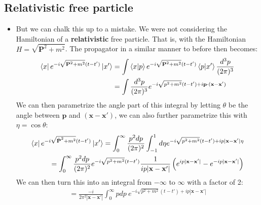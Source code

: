 \documentclass[11pt]{article}
\numberwithin{equation}{section}
\begin{document}
\subsection*{Relativistic free particle}
\begin{itemize}
  \item But we can chalk this up to a mistake. We were not considering the Hamiltonian of a \textbf{relativistic} free particle. That is, with the Hamiltonian $H  = \sqrt{\textbf{P}^2 + m^2}$. The propagator in a similar manner to before then becomes: 
  \begin{equation*}
  \begin{split}
     \bra{x} e^{-i\sqrt{\textbf{P}^2 + m^2}(t-t')} \ket{x'} & = \int \braket{x|p}  e^{-i\sqrt{\textbf{P}^2 + m^2}(t-t')}  \braket{p|x'}\frac{d^3p}{(2\pi)^3} \\
     & = \int \frac{d^3p}{(2\pi)^3}  e^{-i\sqrt{p^2 + m^2}(t-t')+ i\textbf{p}\cdot(\textbf{x}-\textbf{x}')} 
  \end{split}
  \end{equation*}
  We can then parametrize the angle part of this integral by letting $\theta$ be the angle between $\textbf{p}$ and $(\textbf{x}-\textbf{x}')$, we can also further parametrize this with $\eta = \cos{\theta}$:
  \begin{equation*}
  \begin{split}
  \bra{x} e^{-i\sqrt{\hat{\textbf{P}}^2 + m^2}(t-t')} &\ket{x'}  = \int_{0}^{\infty} \frac{p^2dp}{(2\pi)^2}  \int_{-1}^{1} d \eta e^{-i\sqrt{p^2 + m^2}(t-t')+ ip|\textbf{x}-\textbf{x}'|\eta} \\
   = \int_{0}^{\infty} \frac{p^2dp}{(2\pi)^2}& e^{-i\sqrt{p^2 + m^2}(t-t')} \frac{1}{ip|\textbf{x}- \textbf{x}'|}\left(e^{ ip|\textbf{x}-\textbf{x}'|}-e^{- ip|\textbf{x}-\textbf{x}'|} \right)
  \end{split}
  \end{equation*}
  We can then turn this into an integral from $-\infty$ to $\infty$ with a factor of 2:
  \begin{equation}
  \label{Rel_propagator}
  \begin{split}
 = \frac{-i}{2\pi^2|\textbf{x}- \textbf{x}'|}\int_{0}^{\infty}pdp~e^{-i\sqrt{p^2 + m^2}(t-t')+ip|\textbf{x}-\textbf{x}'|}
  \end{split}
  \end{equation}
\end{itemize}
\end{document}

